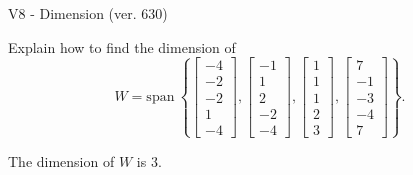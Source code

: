 \begin{exercise}
  \begin{exerciseTitle}V8 - Dimension (ver. 630)\end{exerciseTitle}
  \begin{exerciseStatement}
    Explain how to find the dimension of 
\[W=\mathrm{span}\ \left\{\left[\begin{array}{r}
-4 \\
-2 \\
-2 \\
1 \\
-4
\end{array}\right] , \left[\begin{array}{r}
-1 \\
1 \\
2 \\
-2 \\
-4
\end{array}\right] , \left[\begin{array}{r}
1 \\
1 \\
1 \\
2 \\
3
\end{array}\right] , \left[\begin{array}{r}
7 \\
-1 \\
-3 \\
-4 \\
7
\end{array}\right]\right\}.\]



  \end{exerciseStatement}
  \begin{exerciseAnswer}
   The dimension of \(W\) is  \(3\).
  


  \end{exerciseAnswer}
\end{exercise}